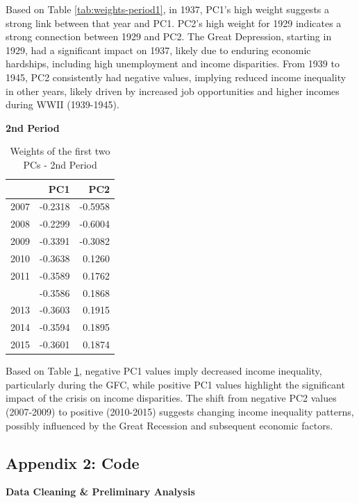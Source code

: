 \documentclass[11pt,a4paper,]{article}
\begin{document}
Based on Table \ref{tab:weights-period1}, in 1937, PC1's high weight suggests a strong link between that year and PC1. PC2's high weight for 1929 indicates a strong connection between 1929 and PC2. The Great Depression, starting in 1929, had a significant impact on 1937, likely due to enduring economic hardships, including high unemployment and income disparities. From 1939 to 1945, PC2 consistently had negative values, implying reduced income inequality in other years, likely driven by increased job opportunities and higher incomes during WWII (1939-1945).

\textbf{2nd Period}\\
\begingroup\fontsize{10}{12}\selectfont

\begin{longtable}[t]{lrr}
\caption{\label{tab:weights-period2}Weights of the first two PCs - 2nd Period}\\
\toprule
  & PC1 & PC2\\
\midrule
2007 & -0.2318 & -0.5958\\
2008 & -0.2299 & -0.6004\\
2009 & -0.3391 & -0.3082\\
2010 & -0.3638 & 0.1260\\
2011 & -0.3589 & 0.1762\\
\addlinespace
2012 & -0.3586 & 0.1868\\
2013 & -0.3603 & 0.1915\\
2014 & -0.3594 & 0.1895\\
2015 & -0.3601 & 0.1874\\
\bottomrule
\end{longtable}
\endgroup{}

Based on Table \ref{tab:weights-period2}, negative PC1 values imply decreased income inequality, particularly during the GFC, while positive PC1 values highlight the significant impact of the crisis on income disparities. The shift from negative PC2 values (2007-2009) to positive (2010-2015) suggests changing income inequality patterns, possibly influenced by the Great Recession and subsequent economic factors.

\newpage

\hypertarget{appendix-2-code}{%
\subsection{Appendix 2: Code}\label{appendix-2-code}}

\textbf{Data Cleaning \& Preliminary Analysis}\\
\tiny  
\end{document}
